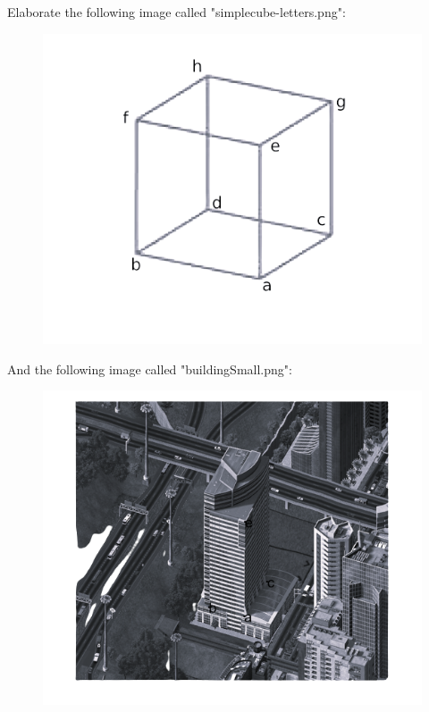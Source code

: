 \documentclass[12pt, a4paper]{report}
\newtheorem[style=M,bodystyle=\normalfont]{theorem}{Theorem}
\newtheorem[style=M,bodystyle=\normalfont]{corollary}{Corollary}
\newtheorem[style=M,bodystyle=\normalfont]{lemma}{Lemma}
\newtheorem[style=M,bodystyle=\normalfont]{definition}{Definition}
\begin{document}
    \newpage

    \begin{Exercise}[label=2]
        Elaborate the following image called "simplecube-letters.png": 
        \begin{figure}[H]
            \centering
            \includegraphics[width=0.5\linewidth]{images/simplecube-letters.png}
        \end{figure}
        And the following image called "buildingSmall.png": 
        \begin{figure}[H]
            \centering
            \includegraphics[width=0.5\linewidth]{images/buildingSmall.png}
        \end{figure}
    \end{Exercise}
\end{document}
